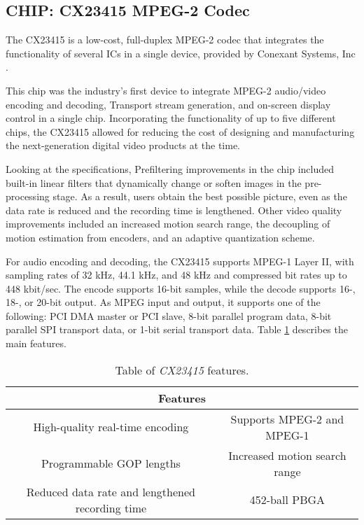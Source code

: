 \subsection{CHIP: CX23415 MPEG-2 Codec}

The CX23415 \cite{cx23415} is a low-cost, full-duplex MPEG-2 codec that integrates the functionality of several ICs in a single device, provided by Conexant Systems, Inc \cite{conexant}.

This chip was the industry's first device to integrate MPEG-2 audio/video encoding and decoding, Transport stream generation, and on-screen display control in a single chip. Incorporating the functionality of up to five different chips, the CX23415 allowed for reducing the cost of designing and manufacturing the next-generation digital video products at the time.

Looking at the specifications, Prefiltering improvements in the chip included built-in linear filters that dynamically change or soften images in the pre-processing stage. As a result, users obtain the best possible picture, even as the data rate is reduced and the recording time is lengthened. Other video quality improvements included an increased motion search range, the decoupling of motion estimation from encoders, and an adaptive quantization scheme. 


For audio encoding and decoding, the CX23415 supports MPEG-1 Layer II, with sampling rates of 32 kHz, 44.1 kHz, and 48 kHz and compressed bit rates up to 448 kbit/sec. The encode supports 16-bit samples, while the decode supports 16-, 18-, or 20-bit output.
As MPEG input and output, it supports one of the following: PCI DMA master or PCI slave, 8-bit parallel program data, 8-bit parallel SPI transport data, or 1-bit serial transport data.
Table \ref{tab:cx} describes the main features.

\begin{table}[h]
    \centering
    \begin{tabular}{|c|c|}
        \hline
        \multicolumn{2}{|c|}{\textbf{Features}} \\
        \hline
         High-quality real-time encoding & Supports MPEG-2 and MPEG-1 \\
         \hline
         Programmable GOP lengths & Increased motion search range \\
         \hline
         Reduced data rate and lengthened recording time & 452-ball PBGA \\
         \hline
    \end{tabular}
    \caption{Table of \textit{CX23415} features.}
    \label{tab:cx}
\end{table}

